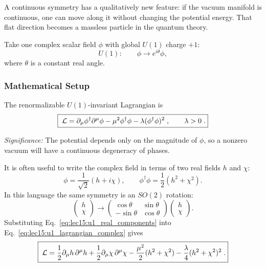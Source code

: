 A continuous symmetry has a qualitatively new feature: if the vacuum manifold is continuous, one can move along it without changing the potential energy. That flat direction becomes a massless particle in the quantum theory.

Take one complex scalar field $\phi$ with global $U(1)$ charge $+1$:
\begin{equation}
  U(1):\qquad \phi\to e^{i\theta}\phi ,
  \label{eq:lec15:u1_transformation}
\end{equation}
where $\theta$ is a constant real angle.

\subsubsection*{Mathematical Setup}

The renormalizable $U(1)$-invariant Lagrangian is
\begin{equation}
  \boxed{\;\mathcal{L}
  =\partial_\mu\phi^\dagger\partial^\mu\phi
   -\mu^2\phi^\dagger\phi
   -\lambda(\phi^\dagger\phi)^2\; ,\qquad \lambda>0\; .}
  \label{eq:lec15:u1_lagrangian_complex}
\end{equation}

\textit{Significance:} The potential depends only on the magnitude of $\phi$, so a nonzero vacuum will have a continuous degeneracy of phases.

It is often useful to write the complex field in terms of two real fields $h$ and $\chi$:
\begin{equation}
  \phi=\frac{1}{\sqrt2}(h+i\chi),
  \qquad
  \phi^\dagger\phi=\frac12(h^2+\chi^2).
  \label{eq:lec15:u1_real_components}
\end{equation}
In this language the same symmetry is an $SO(2)$ rotation:
\begin{equation}
  \begin{pmatrix}h\\ \chi\end{pmatrix}
  \to
  \begin{pmatrix}
    \cos\theta & \sin\theta\\
    -\sin\theta & \cos\theta
  \end{pmatrix}
  \begin{pmatrix}h\\ \chi\end{pmatrix}.
  \label{eq:lec15:u1_so2_rotation}
\end{equation}
Substituting Eq.~\eqref{eq:lec15:u1_real_components} into Eq.~\eqref{eq:lec15:u1_lagrangian_complex} gives
\begin{equation}
  \boxed{\;\mathcal{L}
  =\frac12\partial_\mu h\,\partial^\mu h
   +\frac12\partial_\mu\chi\,\partial^\mu\chi
   -\frac{\mu^2}{2}(h^2+\chi^2)
   -\frac{\lambda}{4}(h^2+\chi^2)^2\; .}
  \label{eq:lec15:u1_lagrangian_real}
\end{equation}

